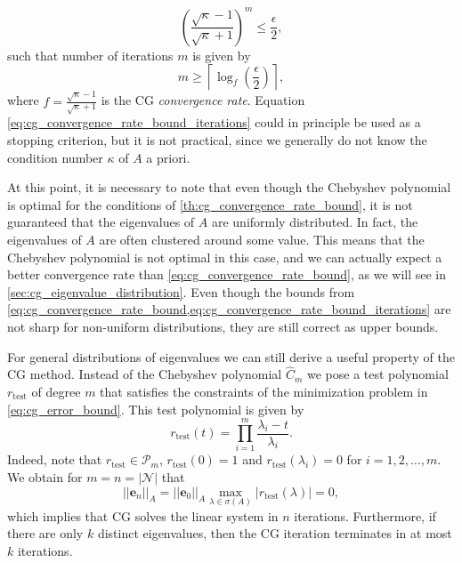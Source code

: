 \begin{equation*}
  \left(\frac{\sqrt{\kappa} - 1}{\sqrt{\kappa} + 1}\right)^{m} \leq \frac{\epsilon}{2},
\end{equation*}
such that number of iterations $m$ is given by
\begin{equation}
  m \geq \left\lceil{\log_f\left(\frac{\epsilon}{2}\right)}\right\rceil,
  \label{eq:cg_convergence_rate_bound_iterations}
\end{equation}
where $f = \frac{\sqrt{\kappa} - 1}{\sqrt{\kappa} + 1}$ is the CG \textit{convergence rate}. Equation \ref{eq:cg_convergence_rate_bound_iterations} could in principle be used as a stopping criterion, but it is not practical, since we generally do not know the condition number $\kappa$ of $A$ a priori.

At this point, it is necessary to note that even though the Chebyshev polynomial is optimal for the conditions of \cref{th:cg_convergence_rate_bound}, it is not guaranteed that the eigenvalues of $A$ are uniformly distributed. In fact, the eigenvalues of $A$ are often clustered around some value. This means that the Chebyshev polynomial is not optimal in this case, and we can actually expect a better convergence rate than \cref{eq:cg_convergence_rate_bound}, as we will see in \cref{sec:cg_eigenvalue_distribution}. Even though the bounds from \cref{eq:cg_convergence_rate_bound,eq:cg_convergence_rate_bound_iterations} are not sharp for non-uniform distributions, they are still correct as upper bounds.

For general distributions of eigenvalues we can still derive a useful property of the CG method. Instead of the Chebyshev polynomial $\hat{C}_m$ we pose a test polynomial $r_{\textrm{test}}$ of degree $m$ that satisfies the constraints of the minimization problem in \cref{eq:cg_error_bound}. This test polynomial is given by
\[
  r_{\textrm{test}}(t) = \prod_{i=1}^m \frac{\lambda_i - t}{\lambda_i}.
\]
Indeed, note that $r_{\textrm{test}}\in\mathcal{P}_m$, $r_{\textrm{test}}(0) = 1$ and $r_{\textrm{test}}(\lambda_i) = 0$ for $i = 1, 2, \dots, m$. We obtain for $m = n = |\mathcal{N}|$ that
\[
  ||\mathbf{e}_n||_A = ||\mathbf{e}_0||_A \max_{\lambda \in \sigma(A)} |r_{\textrm{test}}(\lambda)| = 0,
\]
which implies that CG solves the linear system in $n$ iterations. Furthermore, if there are only $k$ distinct eigenvalues, then the CG iteration terminates in at most $k$ iterations.

